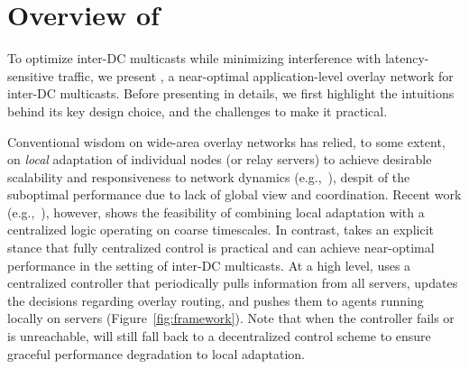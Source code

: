 \section{Overview of \name}
\label{sec:overview}

To optimize inter-DC multicasts while minimizing
interference with latency-sensitive traffic, we present {\em \name},
a near-optimal application-level overlay network for
inter-DC multicasts.
Before presenting \name in details,
we first highlight the intuitions behind its key
design choice, and the challenges to make it practical.







Conventional wisdom on wide-area overlay networks
has relied, to some extent,
on {\em local} adaptation of individual
nodes (or relay servers) to achieve desirable scalability
and responsiveness to network dynamics (e.g.,~\cite{Andreev2013Designing,Repantis2010Scaling,Huang2014A}),
despit of the suboptimal performance due to
lack of global view and coordination.
Recent work (e.g.,~\cite{mukerjee2014enabling}), however,
shows the feasibility of combining
local adaptation with a centralized logic operating
on coarse timescales.
In contrast, \name takes an explicit stance that
fully centralized control is practical and
can achieve near-optimal performance in
the setting of inter-DC multicasts.
At a high level,
\name uses a centralized controller that periodically pulls
information from all servers, updates the decisions regarding overlay
routing, and pushes them to agents running locally on servers
(Figure~\ref{fig:framework}).
Note that when the controller fails or is unreachable,
\name will still fall back to a decentralized control scheme
to ensure graceful performance degradation to
local adaptation.

